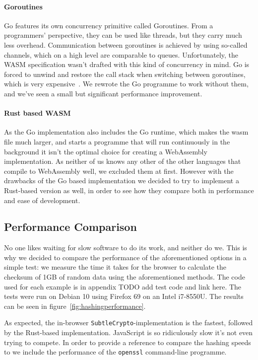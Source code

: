 \paragraph{Goroutines} Go features its own concurrency primitive called Goroutines.
From a programmers' perspective, they can be used like threads, but they carry much less overhead.
Communication between goroutines is achieved by using so-called channels, which on a high level are comparable to queues.
Unfortunately, the \gls{WASM} specification wasn't drafted with this kind of concurrency in mind.
Go is forced to unwind and restore the call stack when switching between goroutines, which is very expensive~\cite{lolnogoroutines}.
We rewrote the Go programme to work without them, and we've seen a small but significant performance improvement.

\paragraph{Rust based WASM}
As the Go implementation also includes the Go runtime,
which makes the wasm file much larger,
and starts a programme that will run continuously in the background it isn't the optimal choice for creating a WebAssembly implementation.
As neither of us knows any other of the other languages that compile to WebAssembly well, we excluded them at first.
However with the drawbacks of the Go based implementation we decided to try to implement a Rust-based version as well,
in order to see how they compare both in performance and ease of development.


\subsection{Performance Comparison}
\label{subsec:perfcomphashing}
No one likes waiting for slow software to do its work, and neither do we.
This is why we decided to compare the performance of the aforementioned options in a simple test:
we measure the time it takes for the browser to calculate the checksum of 1GB of random data using the aforementioned methods.
The code used for each example is in appendix TODO add test code and link here.
The tests were run on Debian 10 using Firefox 69 on an Intel i7-8550U.
The results can be seen in figure~\ref{fig:hashingperformance}.

As expected, the in-browser \texttt{SubtleCrypto}-implementation is the fastest, followed by the Rust-based implementation.
JavaScript is so ridiculously slow it's not even trying to compete.
In order to provide a reference to compare the hashing speeds to we include the performance of the \texttt{openssl} command-line programme.

